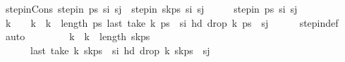 \begin{isabellebody}
\isanewline
{}\isamarkupfalse%
\ step{\isacharunderscore}{\kern0pt}in{\isacharunderscore}{\kern0pt}Cons{\isacharcolon}{\kern0pt}\ {\isachardoublequoteopen}step{\isacharunderscore}{\kern0pt}in\ ps\ s\isactrlsub i\ s\isactrlsub j\ {\isasymLongrightarrow}\ step{\isacharunderscore}{\kern0pt}in\ {\isacharparenleft}{\kern0pt}s\isactrlsub k{\isacharhash}{\kern0pt}ps{\isacharparenright}{\kern0pt}\ s\isactrlsub i\ s\isactrlsub j{\isachardoublequoteclose}\isanewline
%
\isadelimproof
%
\endisadelimproof
%
\isatagproof
{}\isamarkupfalse%
\ {\isacharminus}{\kern0pt}\isanewline
\ \ \isamarkupfalse%
\ {\isachardoublequoteopen}step{\isacharunderscore}{\kern0pt}in\ ps\ s\isactrlsub i\ s\isactrlsub j{\isachardoublequoteclose}\isanewline
\ \ \isamarkupfalse%
\ \isamarkupfalse%
\ k\ \ {\isachardoublequoteopen}{}\ {\isacharless}{\kern0pt}\ k\ {\isasymand}\ k\ {\isacharless}{\kern0pt}\ length\ ps{\isachardoublequoteclose}\ {\isachardoublequoteopen}last\ {\isacharparenleft}{\kern0pt}take\ k\ ps{\isacharparenright}{\kern0pt}\ {\isacharequal}{\kern0pt}\ s\isactrlsub i{\isachardoublequoteclose}\ {\isachardoublequoteopen}hd\ {\isacharparenleft}{\kern0pt}drop\ k\ ps{\isacharparenright}{\kern0pt}\ {\isacharequal}{\kern0pt}\ s\isactrlsub j{\isachardoublequoteclose}\isanewline
\ \ \ \ \isamarkupfalse%
\ step{\isacharunderscore}{\kern0pt}in{\isacharunderscore}{\kern0pt}def\ \isamarkupfalse%
\ auto\ \isanewline
\ \ \isamarkupfalse%
\ \isamarkupfalse%
\ {\isachardoublequoteopen}{}\ {\isacharless}{\kern0pt}\ k{\isacharplus}{\kern0pt}{}\ {\isasymand}\ k{\isacharplus}{\kern0pt}{}\ {\isacharless}{\kern0pt}\ length\ {\isacharparenleft}{\kern0pt}s\isactrlsub k{\isacharhash}{\kern0pt}ps{\isacharparenright}{\kern0pt}{\isachardoublequoteclose}\ \isanewline
\ \ \ \ \ \ {\isachardoublequoteopen}last\ {\isacharparenleft}{\kern0pt}take\ {\isacharparenleft}{\kern0pt}k{\isacharplus}{\kern0pt}{}{\isacharparenright}{\kern0pt}\ {\isacharparenleft}{\kern0pt}s\isactrlsub k{\isacharhash}{\kern0pt}ps{\isacharparenright}{\kern0pt}{\isacharparenright}{\kern0pt}\ {\isacharequal}{\kern0pt}\ s\isactrlsub i{\isachardoublequoteclose}\ {\isachardoublequoteopen}hd\ {\isacharparenleft}{\kern0pt}drop\ {\isacharparenleft}{\kern0pt}k{\isacharplus}{\kern0pt}{}{\isacharparenright}{\kern0pt}\ {\isacharparenleft}{\kern0pt}s\isactrlsub k{\isacharhash}{\kern0pt}ps{\isacharparenright}{\kern0pt}{\isacharparenright}{\kern0pt}\ {\isacharequal}{\kern0pt}\ s\isactrlsub j{\isachardoublequoteclose}\isanewline

\end{isabellebody}
